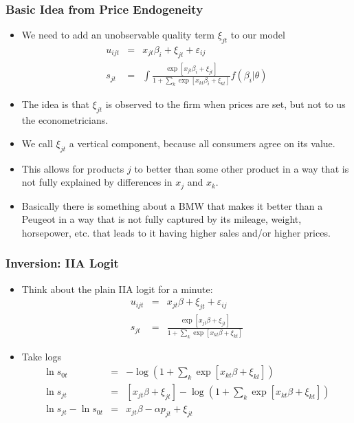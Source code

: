 \documentclass[xcolor=pdftex,dvipsnames,table,mathserif,aspectratio=169]{beamer}
\begin{document}
\begin{frame}
\frametitle{Basic Idea from Price Endogeneity}
 \begin{itemize}
\item We need to add an unobservable quality term $\xi_{jt}$ to our model
\begin{eqnarray*}
u_{ijt} &=& x_{jt} \beta_i + \xi_{jt} +  \varepsilon_{ij} \\
s_{jt} &=& \int \frac{\exp[x_{jt} \beta_i + \xi_{jt} ]}{1+\sum_k \exp[x_{kt} \beta_i + \xi_{kt} ]} f(\beta_i | \theta)
\end{eqnarray*}
\item The idea is that $\xi_{jt}$ is observed to the firm when prices are set, but not to us the econometricians.
\item We call $\xi_{jt}$ a vertical component, because all consumers agree on its value.
\item This allows for products $j$ to better than some other product in a way that is not fully explained by differences in $x_j$ and $x_k$.
\item Basically there is something about a BMW that makes it better than a Peugeot in a way that is not fully captured by its mileage, weight, horsepower, etc. that leads to it having higher sales and/or higher prices.
 \end{itemize}
\end{frame}

\begin{frame}
\frametitle{Inversion: IIA Logit}
 \begin{itemize}
\item Think about the plain IIA logit for a minute:
\begin{eqnarray*}
u_{ijt} &=& x_{jt} \beta + \xi_{jt} +  \varepsilon_{ij} \\
s_{jt} &=& \frac{\exp[x_{jt} \beta + \xi_{jt} ]}{1+\sum_k \exp[x_{kt} \beta + \xi_{kt} ]} 
\end{eqnarray*}
\item Take logs
\begin{eqnarray*}
\ln s_{0t} &=& -\log \left(1+\sum_k \exp[x_{kt} \beta + \xi_{kt}] \right) \\
\ln s_{jt} &=& [x_{jt} \beta + \xi_{jt} ] - \log \left(1+\sum_k \exp[x_{kt} \beta + \xi_{kt}] \right)\\
\ln s_{jt}- \ln s_{0t} &=& x_{jt} \beta -\alpha p_{jt} +  \xi_{jt}
\end{eqnarray*}
 \end{itemize}
\end{frame}
\end{document}
